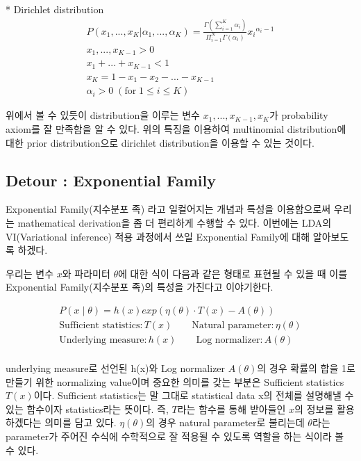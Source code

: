 \documentclass[draft=false]{oblivoir}
\begin{document}
* Dirichlet distribution
\begin{gather*}
P(x_{1},...,x_{K}|\alpha_{1},...,\alpha_{K}) = \frac{\Gamma(\sum^{K}_{i=1}\alpha_{i})}{\Pi^{N}_{i=1}\Gamma(\alpha_{i})}{x_{i}}^{\alpha_{i}-1}\\
x_{1},...,x_{K-1} > 0 \\
x_{1}+...+x_{K-1} < 1 \\
x_{K}=1-x_{1}-x_{2}-...-x_{K-1}\\
\alpha_{i} > 0 \; (\text{for} \; 1 \leq i \leq K)
\end{gather*}

위에서 볼 수 있듯이 distribution을 이루는 변수 $x_{1},...,x_{K-1},x_{K}$가 probability axiom를 잘 만족함을 알 수 있다. 위의 특징을 이용하여 multinomial distribution에 대한 prior distribution으로 dirichlet distribution을 이용할 수 있는 것이다.
\subsection{Detour : Exponential Family}
Exponential Family(지수분포 족) 라고 일컬어지는 개념과 특성을 이용함으로써 우리는 mathematical derivation을 좀 더 편리하게 수행할 수 있다. 이번에는 LDA의 VI(Variational inference) 적용 과정에서 쓰일 Exponential Family에 대해 알아보도록 하겠다. 

우리는 변수 $x$와 파라미터 $\theta$에 대한 식이 다음과 같은 형태로 표현될 수 있을 때 이를 Exponential Family(지수분포 족)의 특성을 가진다고 이야기한다. 

\begin{gather*}
P(x\mid \theta)=h(x)exp(\eta(\theta)\cdot T(x)-A(\theta))\\
\text{Sufficient statistics} : T(x) \qquad
\text{Natural parameter} : \eta(\theta)\\
\text{Underlying measure} : h(x) \qquad
\text{Log normalizer} : A(\theta)\\
\end{gather*}

underlying measure로 선언된 h(x)와 Log normalizer $A(\theta)$의 경우 확률의 합을 1로 만들기 위한 normalizing value이며 중요한 의미를 갖는 부분은 Sufficient statistics $T(x)$이다. Sufficient statistics는 말 그대로 statistical data x의 전체를 설명해낼 수 있는 함수이자 statistics라는 뜻이다. 즉, $T$라는 함수를 통해 받아들인 $x$의 정보를 활용하겠다는 의미를 담고 있다. $\eta(\theta)$의 경우 natural parameter로 불리는데 $\theta$라는 parameter가 주어진 수식에 수학적으로 잘 적용될 수 있도록 역할을 하는 식이라 볼 수 있다. 
\end{document}
